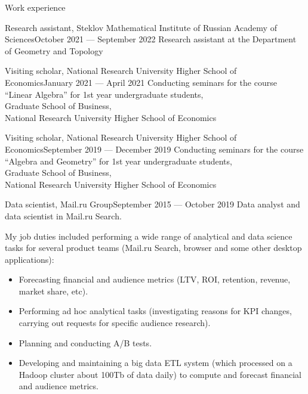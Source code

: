 \documentclass{resume}
\begin{document}
\begin{rSection}{Work experience}
  \begin{rSubsection}{Research assistant, Steklov Mathematical Institute of Russian Academy of Sciences}{October 2021 --- September 2022}{}
    Research assistant at the Department of Geometry and Topology
  \end{rSubsection}

  \begin{rSubsection}{Visiting scholar, National Research University Higher School of Economics}{January 2021 --- April 2021}{}
    Conducting seminars for the course ``Linear Algebra'' for 1st year undergraduate students, \\
    Graduate School of Business, \\
    National Research University Higher School of Economics
  \end{rSubsection}

  \begin{rSubsection}{Visiting scholar, National Research University Higher School of Economics}{September 2019 --- December 2019}{}
    Conducting seminars for the course ``Algebra and Geometry'' for 1st year undergraduate students, \\
    Graduate School of Business, \\
    National Research University Higher School of Economics
  \end{rSubsection}

  \begin{rSubsection}{Data scientist, Mail.ru Group}{September 2015 --- October 2019}{}
    Data analyst and data scientist in Mail.ru Search. \vspace{0.4em}

    My job duties included performing a wide range of analytical and data science tasks for several product
    teams (Mail.ru Search, browser and some other desktop applications):
    \begin{itemize}
      \item Forecasting financial and audience metrics (LTV, ROI, retention, revenue, market share,
        etc).
      \item Performing ad hoc analytical tasks (investigating reasons for KPI changes, carrying out
        requests for specific audience research).
      \item Planning and conducting A/B tests.
      \item Developing and maintaining a big data ETL system (which processed on a Hadoop cluster
        about 100Tb of data daily) to compute and forecast financial and audience metrics.
    \end{itemize}
  \end{rSubsection}
\end{rSection}
\end{document}
